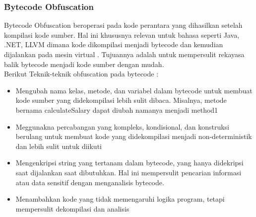 \subsubsection{\f{Bytecode Obfuscation}}
Bytecode Obfuscation beroperasi pada kode perantara yang dihasilkan setelah kompilasi kode sumber. Hal ini khususnya relevan untuk bahasa seperti Java, .NET, LLVM dimana kode dikompilasi menjadi bytecode dan kemudian dijalankan pada mesin virtual \cite{Pie18} \cite{Yak20}. Tujuannya adalah untuk mempersulit rekayasa balik bytecode menjadi kode sumber dengan mudah.\\
Berikut Teknik-teknik obfuscation pada bytecode :
\begin{itemize}
	\item {} Mengubah nama kelas, metode, dan variabel dalam bytecode untuk membuat kode sumber yang didekompilasi lebih sulit dibaca. Misalnya, metode bernama calculateSalary dapat diubah namanya menjadi method1
	\item {} Meggunakna  percabangan yang kompleks, kondisional, dan konstruksi berulang untuk membuat kode yang didekompilasi menjadi non-deterministik dan lebih sulit untuk diikuti
	\item {} Mengenkripsi string yang tertanam dalam bytecode, yang hanya didekripsi saat dijalankan saat dibutuhkan. Hal ini mempersulit pencarian informasi atau data sensitif dengan menganalisis bytecode.
	\item {} Menambahkan kode yang tidak memengaruhi logika program, tetapi mempersulit dekompilasi dan analisis
\end{itemize}

